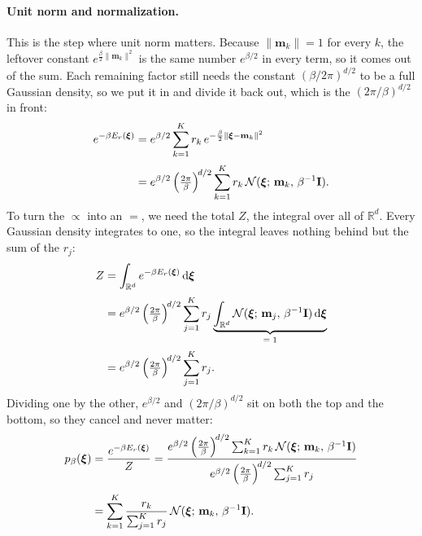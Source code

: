 \paragraph{Unit norm and normalization.}
This is the step where unit norm matters. Because $\lVert\mathbf{m}_k\rVert = 1$
for every $k$, the leftover constant $e^{\frac\beta2\lVert\mathbf{m}_k\rVert^2}$ is
the same number $e^{\beta/2}$ in every term, so it comes out of the sum. Each
remaining
factor still needs the constant $(\beta/2\pi)^{d/2}$ to be a full Gaussian density,
so we put it in and divide it back out, which is the $(2\pi/\beta)^{d/2}$ in front:
\begin{align}
  e^{-\beta E_r(\boldsymbol{\xi})}
  &= e^{\beta/2}\sum_{k=1}^{K} r_k\,
     e^{-\frac\beta2\lVert\boldsymbol{\xi}-\mathbf{m}_k\rVert^2}
     \notag\\[2pt]
  &= e^{\beta/2}\left(\tfrac{2\pi}{\beta}\right)^{\!d/2}
     \sum_{k=1}^{K} r_k\,
     \mathcal{N}(\boldsymbol{\xi};\,\mathbf{m}_k,\,\beta^{-1}\mathbf{I}) .
\end{align}
To turn the $\propto$ into an $=$, we need the total $Z$, the integral over all of
$\mathbb{R}^d$. Every Gaussian density integrates to one, so the integral leaves
nothing behind but the sum of the $r_j$:
\begin{align}
  Z &= \int_{\mathbb{R}^d} e^{-\beta E_r(\boldsymbol{\xi})}\,
       \mathrm{d}\boldsymbol{\xi}
     \notag\\[2pt]
    &= e^{\beta/2}\left(\tfrac{2\pi}{\beta}\right)^{\!d/2}
       \sum_{j=1}^{K} r_j
       \underbrace{\int_{\mathbb{R}^d}
         \mathcal{N}(\boldsymbol{\xi};\,\mathbf{m}_j,\,\beta^{-1}\mathbf{I})\,
         \mathrm{d}\boldsymbol{\xi}}_{=\;1}
     \notag\\[2pt]
    &= e^{\beta/2}\left(\tfrac{2\pi}{\beta}\right)^{\!d/2}
       \sum_{j=1}^{K} r_j .
\end{align}
Dividing one by the other, $e^{\beta/2}$ and $(2\pi/\beta)^{d/2}$ sit on both the
top and the bottom, so they cancel and never matter:
\begin{align}
  p_\beta(\boldsymbol{\xi})
  &= \frac{e^{-\beta E_r(\boldsymbol{\xi})}}{Z}
   = \frac{e^{\beta/2}\left(\tfrac{2\pi}{\beta}\right)^{\!d/2}
           \sum_{k=1}^{K} r_k\,
           \mathcal{N}(\boldsymbol{\xi};\,\mathbf{m}_k,\,\beta^{-1}\mathbf{I})}
          {e^{\beta/2}\left(\tfrac{2\pi}{\beta}\right)^{\!d/2}
           \sum_{j=1}^{K} r_j}
     \notag\\[4pt]
  &= \sum_{k=1}^{K}
     \frac{r_k}{\sum_{j=1}^{K} r_j}\,
     \mathcal{N}(\boldsymbol{\xi};\,\mathbf{m}_k,\,\beta^{-1}\mathbf{I}) .
\end{align}
